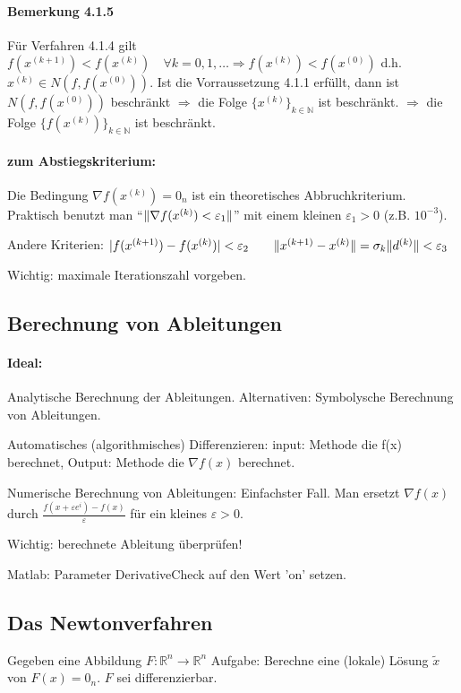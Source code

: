 \documentclass[ngerman,halfparskip]{scrartcl}
\DeclarePairedDelimiter{\abs}{\lvert}{\rvert}
\DeclarePairedDelimiter{\norm}{\lVert}{\rVert}
\theoremstyle{definition}
\newcommand*{\R}{\mathbb{R}}      %
\begin{document}
\paragraph*{Bemerkung 4.1.5} Für Verfahren 4.1.4 gilt $f(x^{(k+1)})<f(x^{(k)})\quad \forall k=0,1,\ldots \Rightarrow f(x^{(k)})<f(x^{(0)})$ d.h. $x^{(k)}\in N(f,f(x^{(0)}))$.
Ist die Vorraussetzung 4.1.1 erfüllt, dann ist $N(f,f(x^{(0)}))$ beschränkt $\Rightarrow$ die Folge $\{x^{(k)}\}_{k\in\mathbb N}$ ist beschränkt. $\Rightarrow$ die Folge $\{f(x^{(k)})\}_{k\in\mathbb N}$ ist beschränkt. 

\paragraph*{zum Abstiegskriterium:} Die Bedingung $\nabla f (x^{(k)})=0_n$ ist ein theoretisches Abbruchkriterium. Praktisch benutzt man "`$\norm{\nabla f (x^{(k)})<\varepsilon_1}$"' mit einem kleinen $\varepsilon_1>0$ (z.B. $10^{-3}$).

Andere Kriterien: $\abs{f (x^{(k+1)})-f (x^{(k)})}<\varepsilon_2\qquad \norm{x^{(k+1)}-x^{(k)}}=\sigma_k\norm{d^{(k)}}<\varepsilon_3$

Wichtig: maximale Iterationszahl vorgeben.

\subsection{Berechnung von Ableitungen}
\paragraph*{Ideal:} Analytische Berechnung der Ableitungen. Alternativen: Symbolysche Berechnung von Ableitungen. 

Automatisches (algorithmisches) Differenzieren: input: Methode die f(x) berechnet, Output: Methode die $\nabla f(x)$ berechnet.

Numerische Berechnung von Ableitungen: Einfachster Fall. Man ersetzt $\nabla f(x)$ durch $\frac{f(x+\varepsilon e^i)-f(x)}{\varepsilon}$ für ein kleines $\varepsilon>0$.

Wichtig: berechnete Ableitung überprüfen!

Matlab: Parameter DerivativeCheck auf den Wert 'on' setzen.

\subsection{Das Newtonverfahren}
Gegeben eine Abbildung $F\colon \R^n\rightarrow\R^n$ Aufgabe: Berechne eine (lokale) Lösung $\tilde x$ von $F(x)=0_n$. $F$ sei differenzierbar.
\end{document}
